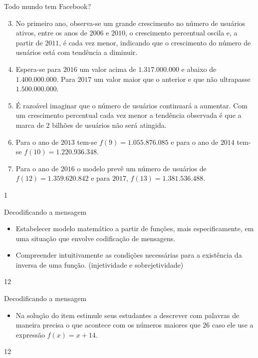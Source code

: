 \begin{answer}{Todo mundo tem Facebook?}
{
\begin{enumerate}\setcounter{enumi}{2}
\item No primeiro ano, observa-se um grande crescimento no número de usuários ativos, entre os anos de $2006$ e $2010$, o crescimento percentual oscila e, a partir de $2011$, é cada vez menor, indicando que o crescimento do número de usuários está com tendência a diminuir.

\item Espera-se para $2016$ um valor acima de $1.317.000.000$ e abaixo de $1.400.000.000$. Para $2017$ um valor maior que o anterior e que não ultrapasse $1.500.000.000$.

\item É razoável imaginar que o número de usuários continuará a aumentar. Com um crescimento percentual cada vez menor a tendência observada é que a marca de $2$ bilhões de usuários não será atingida.

\item Para o ano de $2013$ tem-se $f(9)=1.055.876.085$ e para o ano de $2014$ tem-se $f(10)=1.220.936.348$.

\item Para o ano de $2016$ o modelo prevê um número de usuários de $f(12)=1.359.620.842$ e para $2017$, $f(13)=1.381.536.488$.

\end{enumerate}
}{1}
\end{answer}
\begin{objectives}{Decodificando a mensagem}
{
\begin{itemize}

\item Estabelecer modelo matemático a partir de funções, mais especificamente, em uma situação que envolve codificação de mensagens.

\item Compreender intuitivamente as condições necessárias para a existência da inversa de uma função. (injetividade e sobrejetividade)

\end{itemize}
}{1}{2}
\end{objectives}
\begin{sugestions}{Decodificando a mensagem}
{
\begin{itemize}
\item Na solução do item  estimule seus estudantes a descrever com palavras de maneira precisa o que acontece com os números maiores que $26$ caso ele use a expressão $f(x)=x+14$.
\end{itemize}
}{1}{2}
\end{sugestions}
